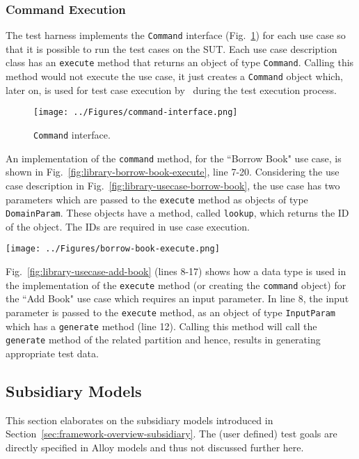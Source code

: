 \subsubsection{Command Execution}
\label{sec:test-harness-command-execution}
The test harness implements the \texttt{Command} interface (Fig.~\ref{fig:test-harness-command-interface}) for each use case so that it is possible to run the test cases on the SUT. Each use case description class has an \texttt{execute} method that returns an object of type \texttt{Command}. Calling this method would not execute the use case, it just creates a \texttt{Command} object which, later on, is used for test case execution by \this~during the test execution process.

\begin{figure}[h]
\centering
\texttt{[image: ../Figures/command-interface.png]}
\caption{\texttt{Command} interface.}
\label{fig:test-harness-command-interface}
\end{figure}

An implementation of the \texttt{command} method, for the ``Borrow Book" use case, is shown in Fig.~\ref{fig:library-borrow-book-execute}, line 7-20. Considering the use case description in Fig.~\ref{fig:library-usecase-borrow-book}, the use case has two parameters which are passed to the \texttt{execute} method as objects of type \texttt{DomainParam}. These objects have a method, called \texttt{lookup}, which returns the ID of the object. The IDs are required in use case execution.

\begin{figure*}[h]
\centering
\texttt{[image: ../Figures/borrow-book-execute.png]}
\caption{Implementation of the \texttt{Command} interface for ``Borrow Book" use case.}
\label{fig:library-borrow-book-execute}
\end{figure*}

Fig.~\ref{fig:library-usecase-add-book} (lines 8-17) shows how a data type is used in the implementation of the \texttt{execute} method (or creating the \texttt{command} object) for the ``Add Book" use case which requires an input parameter.  In line 8, the input parameter is passed to the \texttt{execute} method, as an object of type \texttt{InputParam} which has a \texttt{generate} method (line 12). Calling this method will call the \texttt{generate} method of the related partition and hence, results in generating appropriate test data. 

\subsection{Subsidiary Models}
\label{sec:create-test model-subsidiary-models}
This section elaborates on the subsidiary models introduced in Section~\ref{sec:framework-overview-subsidiary}.
The (user defined) test goals are directly specified in Alloy models and thus not discussed further here.


